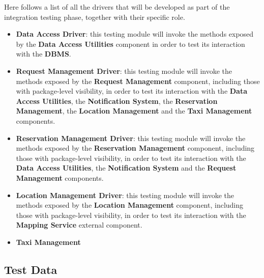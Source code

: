 Here follows a list of all the drivers that will be developed as part of the integration testing phase, together with their specific role.
\begin{itemize}
	\item \textbf{Data Access Driver}: this testing module will invoke the methods exposed by the \textbf{Data Access Utilities} component in order to test its interaction with the \textbf{DBMS}.
	\item \textbf{Request Management Driver}: this testing module will invoke the methods exposed by the \textbf{Request Management} component, including those with package-level visibility, in order to test its interaction with the \textbf{Data Access Utilities}, the \textbf{Notification System}, the \textbf{Reservation Management}, the \textbf{Location Management} and the \textbf{Taxi Management} components. 
	\item \textbf{Reservation Management Driver}: this testing module will invoke the methods exposed by the \textbf{Reservation Management} component, including those with package-level visibility, in order to test its interaction with the \textbf{Data Access Utilities}, the \textbf{Notification System} and the \textbf{Request Management} components. 
	\item \textbf{Location Management Driver}: this testing module will invoke the methods exposed by the \textbf{Location Management} component, including those with package-level visibility, in order to test its interaction with the \textbf{Mapping Service} external component.
	\item \textbf{Taxi Management}
\end{itemize}
\subsection{Test Data}